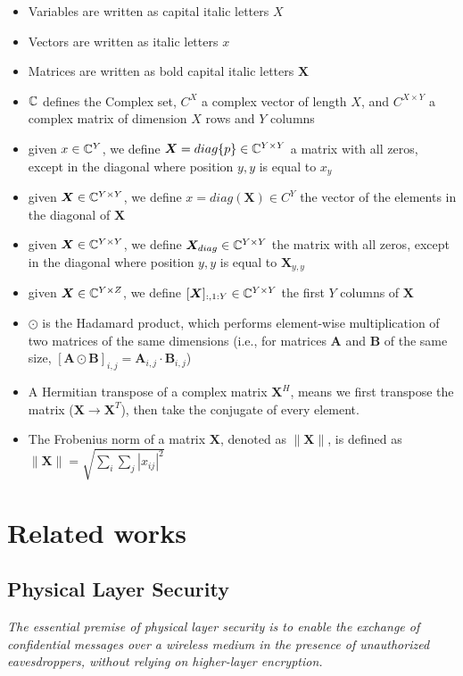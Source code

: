 \begin{itemize}
  \item Variables are written as capital italic letters $X$
  \item Vectors are written as italic letters $x$
  \item Matrices are written as bold capital italic letters $\bm{X}$
  \item $\mathbb{C}$ defines the Complex set, $C^X$ a complex vector of length $X$, and $C^{X \times Y}$ a complex matrix of dimension $X$ rows and $Y$ columns
  \item given $x \in \mathbb{C}^Y$, we define $\bm{X} = diag\{p\} \in \mathbb{C}^{Y \times Y}$ a matrix with all zeros, except in the diagonal where position $y,y$ is equal to $x_y$
  \item given $\bm{X} \in \mathbb{C}^{Y \times Y}$, we define $x = diag(\bm{X}) \in C^Y$ the vector of the elements in the diagonal of $\bm{X}$
  \item given $\bm{X} \in \mathbb{C}^{Y \times Y}$, we define $\bm{X}_{diag} \in \mathbb{C}^{Y \times Y}$ the matrix with all zeros, except in the diagonal where position $y,y$ is equal to $\bm{X}_{y,y}$
  \item given $\bm{X} \in \mathbb{C}^{Y \times Z}$, we define $[\bm{X}]_{:,1:Y} \in \mathbb{C}^{Y \times Y}$ the first $Y$ columns of $\bm{X}$
  \item $\odot$ is the Hadamard product, which performs element-wise multiplication of two matrices of the same dimensions (i.e., for matrices $\bm{A}$ and $\bm{B}$ of the same size, $[\bm{A} \odot \bm{B}]_{i,j} = \bm{A}_{i,j} \cdot \bm{B}_{i,j}$)
  \item A Hermitian transpose of a complex matrix $\bm{X}^H$, means we first transpose the matrix ($\bm{X} \rightarrow \bm{X}^T$), then take the conjugate of every element.
  \item The Frobenius norm of a matrix $\bm{X}$, denoted as $\|\bm{X}\|$, is defined as $\|\bm{X}\| = \sqrt{\sum_{i}\sum_{j} |x_{ij}|^2}$
\end{itemize}

\newpage
\section{Related works}
\subsection{Physical Layer Security}

\textit{The essential premise of physical layer security is to enable the exchange of confidential messages over a wireless medium in the presence of unauthorized eavesdroppers, without relying on higher-layer encryption.}\cite{6739367}

